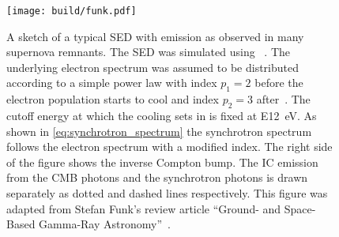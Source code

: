 \begin{figure}[t]
  \centering
  \texttt{[image: build/funk.pdf]}
  \caption[Schematic SED model]{ A sketch of a typical SED with \ssclong emission as observed in many supernova remnants. 
  The SED was simulated using \naima~\cite{naima}. 
  The underlying electron spectrum was assumed to be distributed according to a simple power law with index $p_1=2$ before
  the electron population starts to cool and index $p_2=3$ after~\cite{kardashev}.
  The cutoff energy at which the cooling sets in is fixed at \SI{E12}{\eV}. As shown in \eqref{eq:synchrotron_spectrum} the synchrotron spectrum
  follows the electron spectrum with a modified index.
  The right side of the figure shows the inverse Compton bump. The IC emission from the CMB photons 
  and the synchrotron photons is drawn separately as dotted and dashed lines respectively. This figure was adapted from Stefan Funk's review article
  \enquote{Ground- and Space-Based Gamma-Ray Astronomy}~\cite{funk_gamma}.
  }
  \label{fig:funk_sed}
\end{figure}

